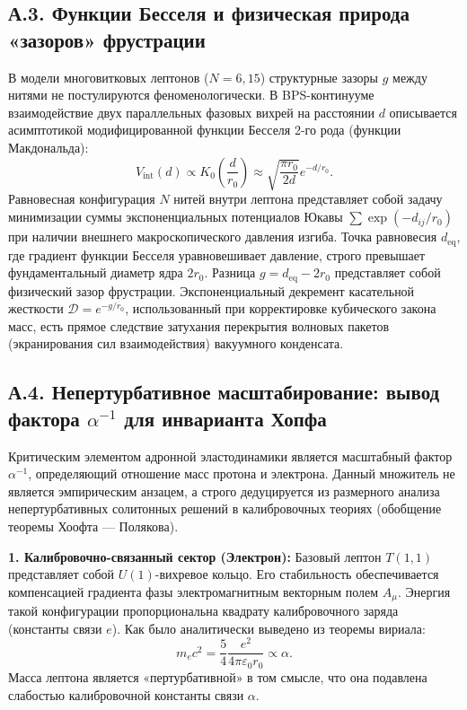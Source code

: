 \documentclass[11pt,a4paper]{article}
\begin{document}
\subsection*{А.3. Функции Бесселя и физическая природа «зазоров» фрустрации}
В модели многовитковых лептонов ($N=6, 15$) структурные зазоры $g$ между нитями не постулируются феноменологически. В BPS-континууме взаимодействие двух параллельных фазовых вихрей на расстоянии $d$ описывается асимптотикой модифицированной функции Бесселя 2-го рода (функции Макдональда):
\begin{equation}
V_{\text{int}}(d) \propto K_0\left(\frac{d}{r_0}\right) \approx \sqrt{\frac{\pi r_0}{2d}} e^{-d/r_0}.
\end{equation}
Равновесная конфигурация $N$ нитей внутри лептона представляет собой задачу минимизации суммы экспоненциальных потенциалов Юкавы $\sum \exp(-d_{ij}/r_0)$ при наличии внешнего макроскопического давления изгиба. Точка равновесия $d_{\text{eq}}$, где градиент функции Бесселя уравновешивает давление, строго превышает фундаментальный диаметр ядра $2r_0$. 
Разница $g = d_{\text{eq}} - 2r_0$ представляет собой физический зазор фрустрации. Экспоненциальный декремент касательной жесткости $\mathcal{D} = e^{-g/r_0}$, использованный при корректировке кубического закона масс, есть прямое следствие затухания перекрытия волновых пакетов (экранирования сил взаимодействия) вакуумного конденсата.

\subsection*{А.4. Непертурбативное масштабирование: вывод фактора $\alpha^{-1}$ для инварианта Хопфа}

Критическим элементом адронной эластодинамики является масштабный фактор $\alpha^{-1}$, определяющий отношение масс протона и электрона. Данный множитель не является эмпирическим анзацем, а строго дедуцируется из размерного анализа непертурбативных солитонных решений в калибровочных теориях (обобщение теоремы Хоофта — Полякова).

\textbf{1. Калибровочно-связанный сектор (Электрон):}
Базовый лептон $T(1,1)$ представляет собой $U(1)$-вихревое кольцо. Его стабильность обеспечивается компенсацией градиента фазы электромагнитным векторным полем $A_\mu$. Энергия такой конфигурации пропорциональна квадрату калибровочного заряда (константы связи $e$). Как было аналитически выведено из теоремы вириала:
\begin{equation}
	m_e c^2 = \frac{5}{4} \frac{e^2}{4\pi\varepsilon_0 r_0} \propto \alpha.
	\label{eq:me_scaling}
\end{equation}
Масса лептона является «пертурбативной» в том смысле, что она подавлена слабостью калибровочной константы связи $\alpha$.
\end{document}
